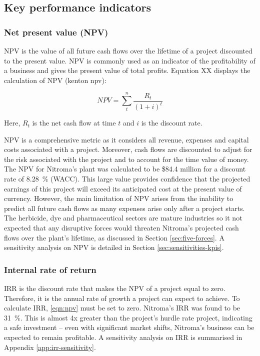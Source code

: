 \subsection{Key performance indicators}
\label{sec:KPIs}

\subsubsection{Net present value (NPV)}
NPV is the value of all future cash flows over the lifetime of a project discounted to the present value. NPV is commonly used as an indicator of the profitability of a business and gives the present value of total profits. Equation XX displays the calculation of NPV (kenton npv):

\begin{equation}
\label{eqn:npv}
    NPV = \sum_t^n\frac{R_{t}}{(1+i)^{t}}
\end{equation}

Here, $R_{t}$ is the net cash flow at time $t$ and $i$ is the discount rate.

NPV is a comprehensive metric as it considers all revenue, expenses and capital costs associated with a project. Moreover, cash flows are discounted to adjust for the risk associated with the project and to account for the time value of money. The NPV for Nitroma’s plant was calculated to be \$84.4 million for a discount rate of \SI{8.28}{\percent} (WACC). This large value provides confidence that the projected earnings of this project will exceed its anticipated cost at the present value of currency. However, the main limitation of NPV arises from the inability to predict all future cash flows as many expenses arise only after a project starts. The herbicide, dye and pharmaceutical sectors are mature industries so it not expected that any disruptive forces would threaten Nitroma’s projected cash flows over the plant’s lifetime, as discussed in Section \ref{sec:five-forces}. A sensitivity analysis on NPV is detailed in Section \ref{sec:sensitivities-kpis}. 

\subsubsection{Internal rate of return}
IRR is the discount rate that makes the NPV of a project equal to zero. Therefore, it is the annual rate of growth a project can expect to achieve. To calculate IRR, \cref{eqn:npv} must be set to zero. Nitroma’s IRR was found to be \SI{31}{\percent}. This is almost 4x greater than the project’s hurdle rate project, indicating a safe investment – even with significant market shifts, Nitroma’s business can be expected to remain profitable. A sensitivity analysis on IRR is summarised in Appendix \ref{app:irr-sensitivity}.

